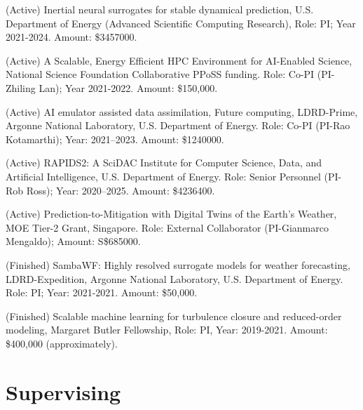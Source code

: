 \documentclass[letterpaper]{article}
\renewenvironment{itemize}{
  \begin{list}{}{
    \setlength{\leftmargin}{1.5em}
  }
}{
  \end{list}
}
\begin{document}
\begin{itemize}

  \item (Active) Inertial neural surrogates for stable dynamical prediction, U.S. Department of Energy (Advanced Scientific Computing Research), Role: PI; Year 2021-2024. Amount: \$3457000.

  \item (Active) A Scalable, Energy Efficient HPC Environment for AI-Enabled Science, National Science Foundation Collaborative PPoSS funding. Role: Co-PI (PI-Zhiling Lan); Year 2021-2022. Amount: \$150,000.

  \item (Active) AI emulator assisted data assimilation, Future computing, LDRD-Prime, Argonne National Laboratory, U.S. Department of Energy. Role: Co-PI (PI-Rao Kotamarthi); Year: 2021--2023. Amount: \$1240000. 

  \item (Active) RAPIDS2: A SciDAC Institute for Computer Science, Data, and Artificial Intelligence, U.S. Department of Energy. Role: Senior Personnel (PI-Rob Ross); Year: 2020--2025. Amount: \$4236400.

  \item (Active) Prediction-to-Mitigation with Digital Twins of the Earth's Weather, MOE Tier-2 Grant, Singapore. Role: External Collaborator (PI-Gianmarco Mengaldo); Amount: S\$685000.

  \item (Finished) SambaWF: Highly resolved surrogate models for weather forecasting, LDRD-Expedition, Argonne National Laboratory, U.S. Department of Energy. Role: PI; Year: 2021-2021. Amount: \$50,000. 

  \item (Finished) Scalable machine learning for turbulence closure and reduced-order modeling, Margaret Butler Fellowship, Role: PI, Year: 2019-2021. Amount: \$400,000 (approximately).


\end{itemize}


\section*{Supervising}
\end{document}
